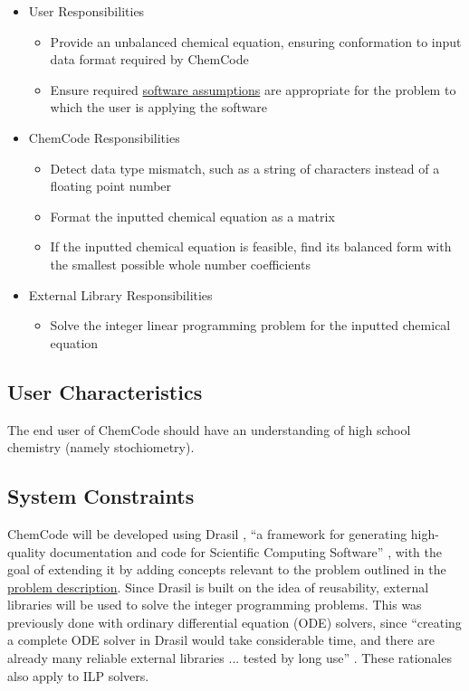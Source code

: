 \documentclass[12pt]{article}
\begin{document}
\begin{itemize}
\item{User Responsibilities}
\begin{itemize}
\item{Provide an unbalanced chemical equation, ensuring conformation to input data format required by ChemCode}
\item{Ensure required \hyperref[Sec:Assumps]{software assumptions} are appropriate for the problem to which the user is applying the software}
\end{itemize}
\item{ChemCode Responsibilities}
\begin{itemize}
\item{Detect data type mismatch, such as a string of characters instead of a floating point number}
\item{Format the inputted chemical equation as a matrix}
\item{If the inputted chemical equation is feasible, find its balanced form with the smallest possible whole number coefficients}
\end{itemize}
\item{External Library Responsibilities}
\begin{itemize}
\item{Solve the integer linear programming problem for the inputted chemical equation}
\end{itemize}
\end{itemize}
\subsection{User Characteristics}
\label{Sec:UserChars}
The end user of ChemCode should have an understanding of high school chemistry (namely stochiometry).

\subsection{System Constraints}
\label{Sec:SysConstraints}
ChemCode will be developed using Drasil \cite{drasilSource}, ``a framework for generating high-quality documentation and code for Scientific Computing Software'' \cite{maclachlan2021}, with the goal of extending it by adding concepts relevant to the problem outlined in the \hyperref[Sec:ProbDesc]{problem description}. Since Drasil is built on the idea of reusability, external libraries will be used to solve the integer programming problems. This was previously done with ordinary differential equation (ODE) solvers, since ``creating a complete ODE solver in Drasil would take considerable time, and there are already many reliable external libraries ... tested by long use'' \cite[(pg. 24)]{chen2022}. These rationales also apply to ILP solvers.
\end{document}
